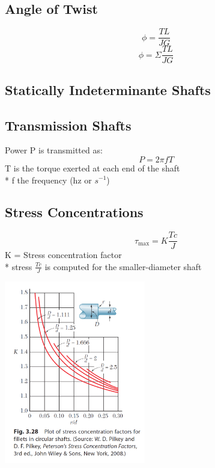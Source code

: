 \documentclass[10pt,landscape]{article}
\newenvironment{Figure}
     {\par\medskip\noindent\minipage{\linewidth}}
     {\endminipage\par\medskip}
\begin{document}
\begin{multicols}{3}
\subsection{Angle of Twist}
\begin{equation}
    \phi=\frac{TL}{JG}
\end{equation}
\begin{equation}
    \phi=\Sigma\frac{TL}{JG}
\end{equation}
\subsection{Statically Indeterminante Shafts}
\subsection{Transmission Shafts}
Power P is transmitted as:
\begin{equation}
    P=2\pi fT
\end{equation}
T is the torque exerted at each end of the shaft\\*
f the frequency (hz or $s^{-1}$)
\subsection{Stress Concentrations}
\begin{equation}
    \tau_{\text{max}}=K\frac{Tc}{J}
\end{equation}
K = Stress concentration factor\\*
stress $\frac{Tc}{J}$ is computed for the smaller-diameter shaft
\begin{Figure}
    \centering
    \includegraphics[width=\linewidth, height=8cm]{PlotStressConcentrationsFilletsRoundShaft.png}
\end{Figure}

\end{multicols}
\end{document}
